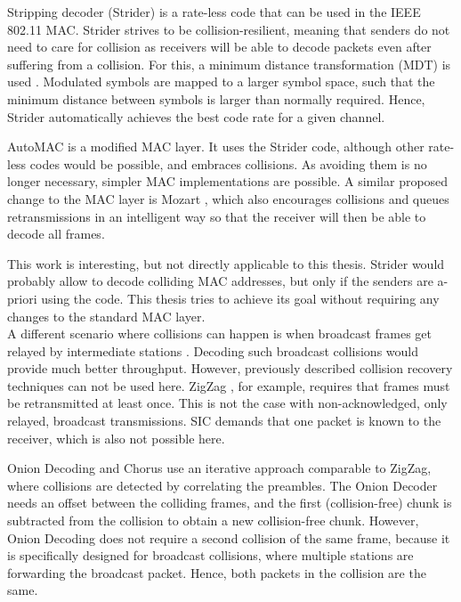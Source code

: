 Stripping decoder (Strider) \cite{gudipati2011} is a rate-less code that can be used in the IEEE 802.11 \gls{MAC}. Strider strives to be collision-resilient, meaning that senders do not need to care for collision as receivers will be able to decode packets even after suffering from a collision. For this, a minimum distance transformation (MDT) is used \cite{gudipati2011}. Modulated symbols are mapped to a larger symbol space, such that the minimum distance between symbols is larger than normally required. Hence, Strider automatically achieves the best code rate for a given channel.

AutoMAC \cite{gudipati2012} is a modified \gls{MAC} layer. It uses the Strider code, although other rate-less codes would be possible, and embraces collisions. As avoiding them is no longer necessary, simpler \gls{MAC} implementations are possible. A similar proposed change to the \gls{MAC} layer is Mozart \cite{bansal2013}, which also encourages collisions and queues retransmissions in an intelligent way so that the receiver will then be able to decode all frames.

This work is interesting, but not directly applicable to this thesis. Strider would probably allow to decode colliding \gls{MAC} addresses, but only if the senders are a-priori using the code. This thesis tries to achieve its goal without requiring any changes to the standard \gls{MAC} layer.\\

A different scenario where collisions can happen is when broadcast frames get relayed by intermediate stations \cite{hejazi2010}. Decoding  such broadcast collisions would provide much better throughput. However, previously described collision recovery techniques can not be used here. ZigZag \cite{gollakota2008}, for example, requires that frames must be retransmitted at least once. This is not the case with non-acknowledged, only relayed, broadcast transmissions. \gls{SIC} \cite{patel1994} demands that one packet is known to the receiver, which is also not possible here.

Onion Decoding \cite{wang2010} and Chorus \cite{zhang2010} use an iterative approach comparable to ZigZag, where collisions are detected by correlating the preambles. The Onion Decoder needs an offset between the colliding frames, and the first (collision-free) chunk is subtracted from the collision to obtain a new collision-free chunk. However, Onion Decoding does not require a second collision of the same frame, because it is specifically designed for broadcast collisions, where multiple stations are forwarding the broadcast packet. Hence, both packets in the collision are the same.

